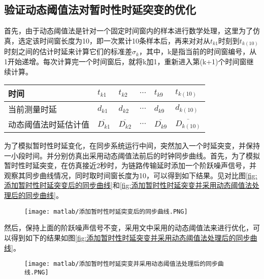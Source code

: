 \subsection{验证动态阈值法对暂时性时延突变的优化}
首先，由于动态阈值法是针对一个固定时间窗内的样本进行数学处理，这里为了仿真，选定该时间窗长度为10，即一次累计10条样本后，再来对对从$t_{k1}$时刻到$t_{k(10)}$时刻之间的估计时延来计算它们的标准差$\sigma_{k}$，其中，k是指当前的时间窗编号，从1开始递增。每次计算完一个时间窗后，就将k加1，重新进入第(k+1)个时间窗继续计算。
\begin{table}[!hpb]
  \centering
  \begin{tabular}{llllll} \toprule
    时间 & $t_{k1}$ & $t_{k2}$ & $\cdots$ & $t_{k9}$ & $t_{k(10)}$ \\ \midrule
    当前测量时延 & $d_{k1}$ & $d_{k2}$ & $\cdots$ & $d_{k9}$ & $d_{k(10)}$ \\ \midrule
    动态阈值法时延估计值 & $\overline{D_{k1}}$ & $\overline{D_{k2}}$ & $\cdots$ & $\overline{D_{k9}}$ & $\overline{D_{k(10)}}$  \\ \bottomrule
  \end{tabular}
\end{table}

为了模拟暂时性时延变化，在同步系统运行中间，突然加入一个时延突变，并保持一小段时间。并分别仿真出采用动态阈值法前后的时钟同步曲线。首先，为了模拟暂时性时延突变，在仿真接近2秒时，为链路传输延时添加一个阶跃噪声信号，并观察其同步曲线情况，同时取时间窗长度为10，可以得到如下结果。见对比图\ref{fig:添加暂时性时延突变后的同步曲线}和\ref{fig:添加暂时性时延突变并采用动态阈值法处理后的同步曲线}。
\begin{figure}[htbp]
  \centering
  \begin{minipage}[b]{1\textwidth}
    \captionstyle{\centering}
    \centering
    \texttt{[image: matlab/添加暂时性时延突变后的同步曲线.PNG]}
  \end{minipage}     
\end{figure}

然后，保持上面的阶跃噪声信号不变，采用文中采用的动态阈值法来进行优化，可以得到如下的结果如图\ref{fig:添加暂时性时延突变并采用动态阈值法处理后的同步曲线}。
\begin{figure}[htbp]
  \centering
  \begin{minipage}[b]{1\textwidth}
    \captionstyle{\centering}
    \centering
    \texttt{[image: matlab/添加暂时性时延突变并采用动态阈值法处理后的同步曲线.PNG]}
  \end{minipage}     
\end{figure}

